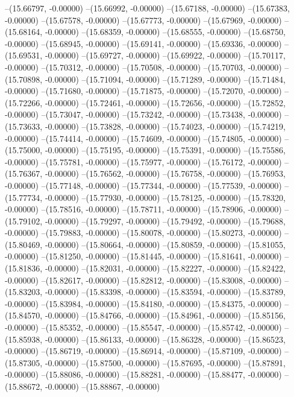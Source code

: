 --(15.66797, -0.00000)
--(15.66992, -0.00000)
--(15.67188, -0.00000)
--(15.67383, -0.00000)
--(15.67578, -0.00000)
--(15.67773, -0.00000)
--(15.67969, -0.00000)
--(15.68164, -0.00000)
--(15.68359, -0.00000)
--(15.68555, -0.00000)
--(15.68750, -0.00000)
--(15.68945, -0.00000)
--(15.69141, -0.00000)
--(15.69336, -0.00000)
--(15.69531, -0.00000)
--(15.69727, -0.00000)
--(15.69922, -0.00000)
--(15.70117, -0.00000)
--(15.70312, -0.00000)
--(15.70508, -0.00000)
--(15.70703, -0.00000)
--(15.70898, -0.00000)
--(15.71094, -0.00000)
--(15.71289, -0.00000)
--(15.71484, -0.00000)
--(15.71680, -0.00000)
--(15.71875, -0.00000)
--(15.72070, -0.00000)
--(15.72266, -0.00000)
--(15.72461, -0.00000)
--(15.72656, -0.00000)
--(15.72852, -0.00000)
--(15.73047, -0.00000)
--(15.73242, -0.00000)
--(15.73438, -0.00000)
--(15.73633, -0.00000)
--(15.73828, -0.00000)
--(15.74023, -0.00000)
--(15.74219, -0.00000)
--(15.74414, -0.00000)
--(15.74609, -0.00000)
--(15.74805, -0.00000)
--(15.75000, -0.00000)
--(15.75195, -0.00000)
--(15.75391, -0.00000)
--(15.75586, -0.00000)
--(15.75781, -0.00000)
--(15.75977, -0.00000)
--(15.76172, -0.00000)
--(15.76367, -0.00000)
--(15.76562, -0.00000)
--(15.76758, -0.00000)
--(15.76953, -0.00000)
--(15.77148, -0.00000)
--(15.77344, -0.00000)
--(15.77539, -0.00000)
--(15.77734, -0.00000)
--(15.77930, -0.00000)
--(15.78125, -0.00000)
--(15.78320, -0.00000)
--(15.78516, -0.00000)
--(15.78711, -0.00000)
--(15.78906, -0.00000)
--(15.79102, -0.00000)
--(15.79297, -0.00000)
--(15.79492, -0.00000)
--(15.79688, -0.00000)
--(15.79883, -0.00000)
--(15.80078, -0.00000)
--(15.80273, -0.00000)
--(15.80469, -0.00000)
--(15.80664, -0.00000)
--(15.80859, -0.00000)
--(15.81055, -0.00000)
--(15.81250, -0.00000)
--(15.81445, -0.00000)
--(15.81641, -0.00000)
--(15.81836, -0.00000)
--(15.82031, -0.00000)
--(15.82227, -0.00000)
--(15.82422, -0.00000)
--(15.82617, -0.00000)
--(15.82812, -0.00000)
--(15.83008, -0.00000)
--(15.83203, -0.00000)
--(15.83398, -0.00000)
--(15.83594, -0.00000)
--(15.83789, -0.00000)
--(15.83984, -0.00000)
--(15.84180, -0.00000)
--(15.84375, -0.00000)
--(15.84570, -0.00000)
--(15.84766, -0.00000)
--(15.84961, -0.00000)
--(15.85156, -0.00000)
--(15.85352, -0.00000)
--(15.85547, -0.00000)
--(15.85742, -0.00000)
--(15.85938, -0.00000)
--(15.86133, -0.00000)
--(15.86328, -0.00000)
--(15.86523, -0.00000)
--(15.86719, -0.00000)
--(15.86914, -0.00000)
--(15.87109, -0.00000)
--(15.87305, -0.00000)
--(15.87500, -0.00000)
--(15.87695, -0.00000)
--(15.87891, -0.00000)
--(15.88086, -0.00000)
--(15.88281, -0.00000)
--(15.88477, -0.00000)
--(15.88672, -0.00000)
--(15.88867, -0.00000)
